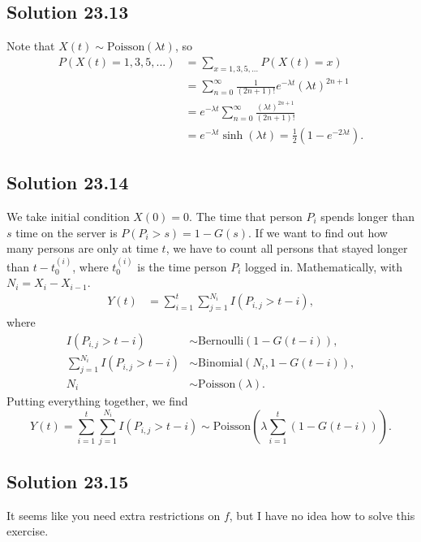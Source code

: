 \subsection*{Solution 23.13}

Note that $X(t) \sim \mathrm{Poisson}(\lambda t)$, so
\begin{equation*}
    \begin{split}
        P(X(t) = 1, 3, 5, ...)
            &= \sum_{x = 1, 3, 5, ...} P(X(t) = x) \\
            &= \sum_{n = 0}^{\infty} \frac{1}{(2n + 1)!} e^{-\lambda t} (\lambda t)^{2n + 1} \\
            &= e^{-\lambda t} \sum_{n = 0}^{\infty} \frac{(\lambda t)^{2n + 1}}{(2n + 1)!} \\
            &= e^{-\lambda t} \sinh(\lambda t)
            = \frac{1}{2}(1 - e^{-2 \lambda t}).
    \end{split}
\end{equation*}


\subsection*{Solution 23.14}

We take initial condition $X(0) = 0$.
The time that person $P_i$ spends longer than $s$ time on the server is $P(P_i > s) = 1 - G(s)$.
If we want to find out how many persons are only at time $t$, we have to count all persons that stayed longer than $t - t_0^{(i)}$, where $t_0^{(i)}$ is the time person $P_i$ logged in.
Mathematically, with $N_i = X_{i} - X_{i-1}$.
\begin{equation*}
    \begin{split}
        Y(t) &= \sum_{i = 1}^{t} \sum_{j = 1}^{N_i} I(P_{i, j} > t - i),
    \end{split}
\end{equation*}
where
\begin{equation*}
    \begin{split}
        I(P_{i,j} > t - i) &\sim \mathrm{Bernoulli}(1 - G(t - i)), \\
        \sum_{j = 1}^{N_i} I(P_{i,j} > t - i) &\sim \mathrm{Binomial}(N_i, 1 - G(t - i)), \\
        N_i &\sim \mathrm{Poisson}(\lambda).
    \end{split}
\end{equation*}
Putting everything together, we find
\begin{equation*}
    Y(t) = \sum_{i = 1}^{t} \sum_{j = 1}^{N_i} I(P_{i, j} > t - i)
        \sim \mathrm{Poisson}\left(\lambda \sum_{i = 1}^{t}(1 - G(t - i))\right).
\end{equation*}


\subsection*{Solution 23.15}

It seems like you need extra restrictions on $f$, but I have no idea how to solve this exercise.
